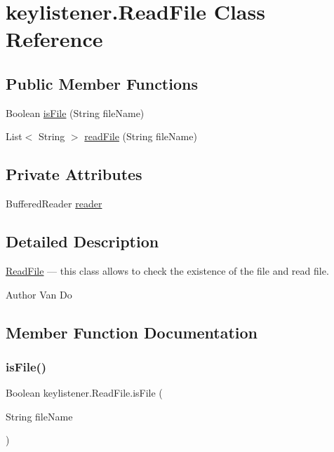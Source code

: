 \hypertarget{classkeylistener_1_1_read_file}{}\section{keylistener.\+Read\+File Class Reference}
\label{classkeylistener_1_1_read_file}
\subsection*{Public Member Functions}
\begin{DoxyCompactItemize}
\item 
Boolean \hyperlink{classkeylistener_1_1_read_file_a2438c71e757495e44c2892ff821ad189}{is\+File} (String file\+Name)
\item 
List$<$ String $>$ \hyperlink{classkeylistener_1_1_read_file_a889398266aa6c457b948b5ab40a2548e}{read\+File} (String file\+Name)
\end{DoxyCompactItemize}
\subsection*{Private Attributes}
\begin{DoxyCompactItemize}
\item 
Buffered\+Reader \hyperlink{classkeylistener_1_1_read_file_a18760d47084093fc16d97fc105c48c1e}{reader}
\end{DoxyCompactItemize}


\subsection{Detailed Description}
\hyperlink{classkeylistener_1_1_read_file}{Read\+File} --- this class allows to check the existence of the file and read file. \begin{DoxyAuthor}{Author}
Van Do 
\end{DoxyAuthor}


\subsection{Member Function Documentation}
\mbox{\label{classkeylistener_1_1_read_file_a2438c71e757495e44c2892ff821ad189}} 
\subsubsection{\texorpdfstring{is\+File()}{isFile()}}
{\footnotesize\ttfamily Boolean keylistener.\+Read\+File.\+is\+File (\begin{DoxyParamCaption}\item[{String}]{file\+Name }\end{DoxyParamCaption})\hspace{0.3cm}{\ttfamily [inline]}}


